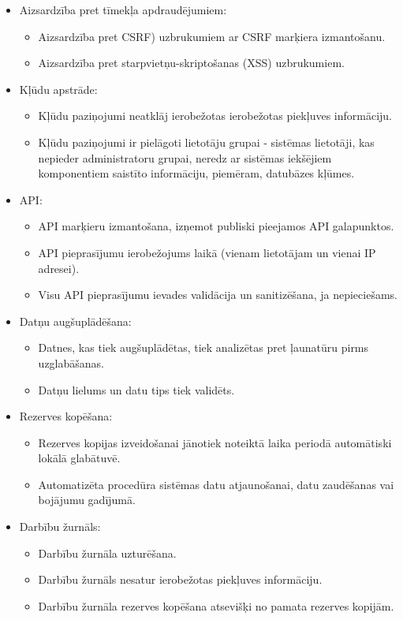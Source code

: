 \begin{itemize}
	\item Aizsardzība pret tīmekļa apdraudējumiem:
	      \begin{itemize}
		      \item Aizsardzība pret CSRF) uzbrukumiem ar CSRF marķiera izmantošanu.
		      \item Aizsardzība pret starpvietņu-skriptošanas (XSS) uzbrukumiem.
	      \end{itemize}

	\item Kļūdu apstrāde:
	      \begin{itemize}
		      \item Kļūdu paziņojumi neatklāj ierobežotas ierobežotas piekļuves informāciju.
		      \item Kļūdu paziņojumi ir pielāgoti lietotāju grupai - sistēmas lietotāji, kas nepieder administratoru grupai, neredz ar sistēmas iekšējiem komponentiem saistīto informāciju, piemēram, datubāzes kļūmes.
	      \end{itemize}

	\item API:
	      \begin{itemize}
		      \item API marķieru izmantošana, izņemot publiski pieejamos API galapunktos.
		      \item API pieprasījumu ierobežojums laikā (vienam lietotājam un vienai IP adresei).
		      \item Visu API pieprasījumu ievades validācija un sanitizēšana, ja nepieciešams.
	      \end{itemize}

	\item Datņu augšuplādēšana:
	      \begin{itemize}
		      \item Datnes, kas tiek augšuplādētas, tiek analizētas pret ļaunatūru pirms uzglabāšanas.
		      \item Datņu lielums un datu tips tiek validēts.
	      \end{itemize}

	\item Rezerves kopēšana:
	      \begin{itemize}
		      \item Rezerves kopijas izveidošanai jānotiek noteiktā laika periodā automātiski lokālā glabātuvē.
		      \item Automatizēta procedūra sistēmas datu atjaunošanai, datu zaudēšanas vai bojājumu gadījumā.
	      \end{itemize}

	\item Darbību žurnāls:
	      \begin{itemize}
		      \item Darbību žurnāla uzturēšana.
		      \item Darbību žurnāls nesatur ierobežotas piekļuves informāciju.
		      \item Darbību žurnāla rezerves kopēšana atsevišķi no pamata rezerves kopijām.
	      \end{itemize}
\end{itemize}
